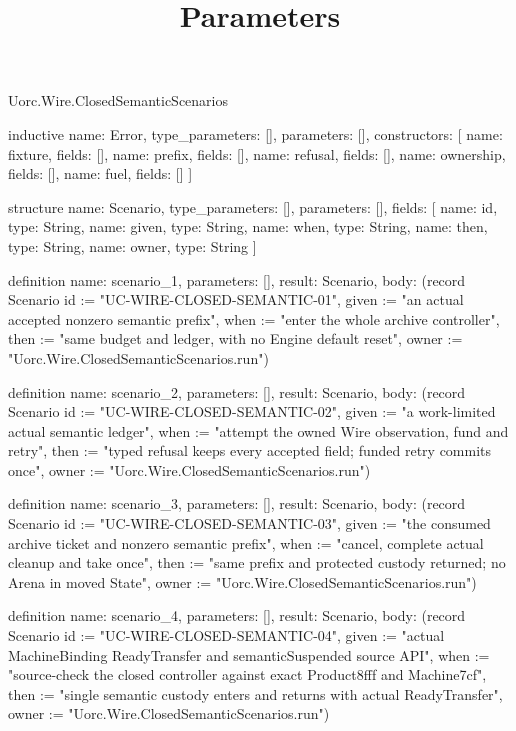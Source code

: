\begin{lexlean}{Uorc.Wire.ClosedSemanticScenarios}
\title{Parameters}
\begin{semanticmodule}
inductive{
  name: Error,
  type_parameters: [],
  parameters: [],
  constructors: [
    {name: fixture, fields: []},
    {name: prefix, fields: []},
    {name: refusal, fields: []},
    {name: ownership, fields: []},
    {name: fuel, fields: []}
  ]
}

structure{
  name: Scenario,
  type_parameters: [],
  parameters: [],
  fields: [
    {name: id, type: String},
    {name: given, type: String},
    {name: when, type: String},
    {name: then, type: String},
    {name: owner, type: String}
  ]
}

definition{
  name: scenario_1,
  parameters: [],
  result: Scenario,
  body: (record Scenario {id := "UC-WIRE-CLOSED-SEMANTIC-01", given := "an actual accepted nonzero semantic prefix", when := "enter the whole archive controller", then := "same budget and ledger, with no Engine default reset", owner := "Uorc.Wire.ClosedSemanticScenarios.run"})
}

definition{
  name: scenario_2,
  parameters: [],
  result: Scenario,
  body: (record Scenario {id := "UC-WIRE-CLOSED-SEMANTIC-02", given := "a work-limited actual semantic ledger", when := "attempt the owned Wire observation, fund and retry", then := "typed refusal keeps every accepted field; funded retry commits once", owner := "Uorc.Wire.ClosedSemanticScenarios.run"})
}

definition{
  name: scenario_3,
  parameters: [],
  result: Scenario,
  body: (record Scenario {id := "UC-WIRE-CLOSED-SEMANTIC-03", given := "the consumed archive ticket and nonzero semantic prefix", when := "cancel, complete actual cleanup and take once", then := "same prefix and protected custody returned; no Arena in moved State", owner := "Uorc.Wire.ClosedSemanticScenarios.run"})
}

definition{
  name: scenario_4,
  parameters: [],
  result: Scenario,
  body: (record Scenario {id := "UC-WIRE-CLOSED-SEMANTIC-04", given := "actual MachineBinding ReadyTransfer and semanticSuspended source API", when := "source-check the closed controller against exact Product8fff and Machine7cf", then := "single semantic custody enters and returns with actual ReadyTransfer", owner := "Uorc.Wire.ClosedSemanticScenarios.run"})
}


\end{semanticmodule}
\end{lexlean}
